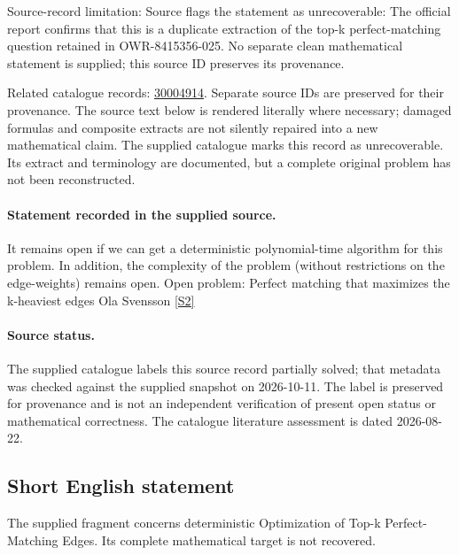 \documentclass[11pt]{article}
\begin{document}
Source-record limitation: Source flags the statement as unrecoverable: The official report confirms that this is a duplicate extraction of the top-k perfect-matching question retained in OWR-8415356-025. No separate clean mathematical statement is supplied; this source ID preserves its provenance.

Related catalogue records: \href{https://mehmetmars7.github.io/Erdosproblems-llm-hunter/problem.html?type=open_problems&id=30004914}{30004914}. Separate source IDs are preserved for their provenance.
The source text below is rendered literally where necessary; damaged formulas and composite extracts are not silently repaired into a new mathematical claim.
The supplied catalogue marks this record as unrecoverable. Its extract and terminology are documented, but a complete original problem has not been reconstructed.
\paragraph{Statement recorded in the supplied source.}
It remains open if we can get a deterministic polynomial-time algorithm for this problem. In addition, the complexity of the problem (without restrictions on the edge-weights) remains open. Open problem: Perfect matching that maximizes the k-heaviest edges Ola Svensson \href{https://doi.org/10.4171/owr/2021/53}{[S2]}
\paragraph{Source status.}
The supplied catalogue labels this source record partially solved; that metadata was checked against the supplied snapshot on 2026-10-11. The label is preserved for provenance and is not an independent verification of present open status or mathematical correctness. The catalogue literature assessment is dated 2026-08-22.
\subsection{Short English statement}
The supplied fragment concerns deterministic Optimization of Top-k Perfect-Matching Edges. Its complete mathematical target is not recovered.
\end{document}
